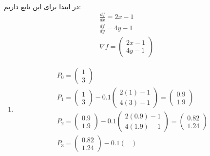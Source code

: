 \\\noindent
در ابتدا برای این تابع داریم:
\begin{gather*}
    \frac{df}{dx} = 2x - 1\\
    \frac{df}{dy} = 4y - 1\\
    \nabla f = \begin{pmatrix}
        2x - 1\\
        4y - 1
    \end{pmatrix} 
\end{gather*}
\begin{enumerate}
    \item \begin{gather*}
        P_0 = \begin{pmatrix}
            1\\
            3
        \end{pmatrix}\\
        P_1 = \begin{pmatrix}
            1\\
            3
        \end{pmatrix} - 0.1 \begin{pmatrix}
            2(1) - 1\\
            4(3) - 1
        \end{pmatrix}
        = \begin{pmatrix}
            0.9\\
            1.9
        \end{pmatrix}\\
        P_2 = \begin{pmatrix}
            0.9\\
            1.9
        \end{pmatrix} - 0.1 \begin{pmatrix}
            2(0.9) - 1\\
            4(1.9) - 1
        \end{pmatrix}
        = \begin{pmatrix}
            0.82\\
            1.24
        \end{pmatrix}\\
        P_3 = \begin{pmatrix}
            0.82\\
            1.24
        \end{pmatrix} - 0.1 \begin{pmatrix}

\end{pmatrix}
\end{gather*}
\end{enumerate}

